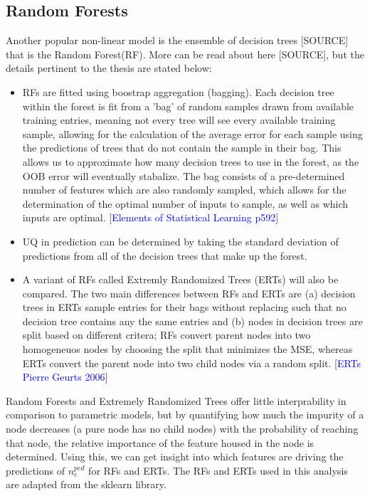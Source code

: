 \documentclass[a4paper, twoside, final, 12pt]{article}
\begin{document}
\subsection{Random Forests}
Another popular non-linear model is the ensemble of decision trees [SOURCE] that is the Random Forest(RF). More can be read about here [SOURCE], but the details pertinent to the thesis are stated below:
\begin{itemize}
	\item RFs are fitted using boostrap aggregation (bagging). Each decision tree within the forest is fit from a 'bag' of random samples drawn from available training entries, meaning not every tree will see every available training sample, allowing for the calculation of the average error for each sample using the predictions of trees that do not contain the sample in their bag. This allows us to approximate how many decision trees to use in the forest, as the OOB error will eventually stabalize. The bag consists of a pre-determined number of features which are also randomly sampled, which allows for the determination of the optimal number of inputs to sample, as well as which inputs are optimal.  [\textcolor{blue}{Elements of Statistical Learning p592}]
	\item UQ in prediction can be determined by taking the standard deviation of predictions from all of the decision trees that make up the forest. 
	\item A variant of RFs called Extremly Randomized Trees (ERTs) will also be compared. The two main differences between RFs and ERTs are (a) decision trees in ERTs sample entries for their bags without replacing such that no decision tree contains any the same entries and (b) nodes in decision trees are split based on different critera; RFs convert parent nodes into two homogeneuos nodes by choosing the split that minimizes the MSE, whereas ERTs convert the parent node into two child nodes via a random split. [\textcolor{blue}{ERTs Pierre Geurts 2006}]
\end{itemize}

Random Forests and Extremely Randomized Trees offer little interprability in comparison to parametric models, but by quantifying how much the impurity of a node decreases (a pure node has no child nodes) with the probability of reaching that node, the relative importance of the feature housed in the node is determined. Using this, we can get insight into which features are driving the predictions of $n_e^{ped}$ for RFs and ERTs. The RFs and ERTs used in this analysis are adapted from the sklearn library. 
\end{document}
